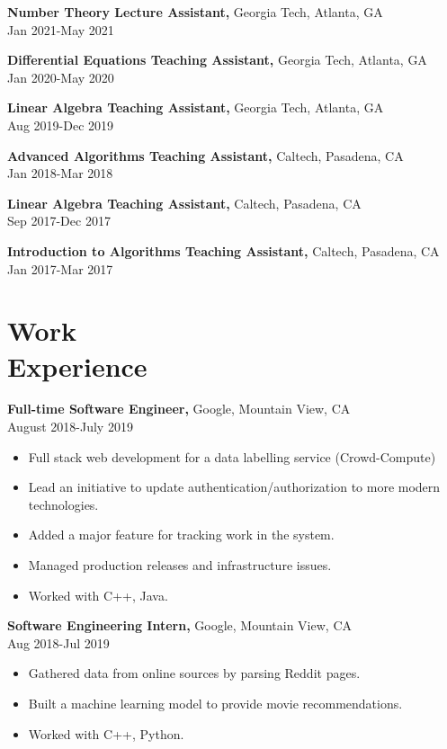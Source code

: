 \documentclass[margin]{res}
\begin{document}
\begin{resume}
{\bf Number Theory Lecture Assistant,} Georgia Tech, Atlanta, GA \\ Jan 2021-May 2021

{\bf Differential Equations Teaching Assistant,} Georgia Tech, Atlanta, GA \\ Jan 2020-May 2020

{\bf Linear Algebra Teaching Assistant,} Georgia Tech, Atlanta, GA \\ Aug 2019-Dec 2019

{\bf Advanced Algorithms Teaching Assistant,} Caltech, Pasadena, CA \\ Jan 2018-Mar 2018

{\bf Linear Algebra Teaching Assistant,} Caltech, Pasadena, CA \\ Sep 2017-Dec 2017

{\bf Introduction to Algorithms Teaching Assistant,} Caltech, Pasadena, CA \\ Jan 2017-Mar 2017

 \section{Work\\ Experience}
 {\bf Full-time Software Engineer,} Google, Mountain View, CA \\ August 2018-July 2019
 \begin{itemize} \itemsep -2pt  %
 \item Full stack web development for a data labelling service (Crowd-Compute)
 \item Lead an initiative to update authentication/authorization to more modern technologies.
 \item Added a major feature for tracking work in the system.
 \item Managed production releases and infrastructure issues.
 \item Worked with C++, Java.
 \end{itemize}
 
{\bf Software Engineering Intern,} Google, Mountain View, CA \\ Aug 2018-Jul 2019
\begin{itemize} \itemsep -2pt %
\item Gathered data from online sources by parsing Reddit pages.
\item Built a machine learning model to provide movie recommendations.
\item Worked with C++, Python.
\end{itemize}

\end{resume} 
\end{document}
